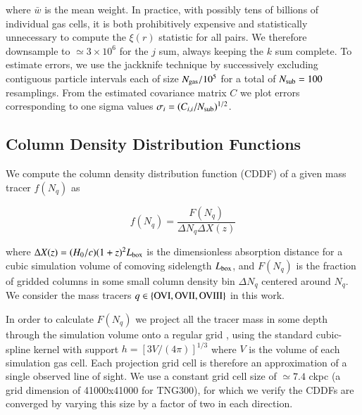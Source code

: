 \documentclass[useAMS,usenatbib]{mnras}
\begin{document}
\noindent where $\bar{w}$ is the mean weight. In practice, with possibly tens of billions of individual gas cells, it is both prohibitively expensive and statistically unnecessary to compute the $\xi(r)$ statistic for all pairs. We therefore downsample to $\simeq 3 \times 10^6$ for the $j$ sum, always keeping the $k$ sum complete. To estimate errors, we use the jackknife technique \citep[see][]{norberg09} by successively excluding contiguous particle intervals each of size $N_{\rm gas}/10^5$ for a total of $N_{\rm sub}=100$ resamplings. From the estimated covariance matrix $C$ we plot errors corresponding to one sigma values $\sigma_i = (C_{i,i} / N_{\rm sub})^{1/2}$. %



\subsection{Column Density Distribution Functions} \label{sec_cddf}

We compute the column density distribution function (CDDF) of a given mass tracer $f(N_q)$ as

\begin{equation}
f(N_q) = \frac{F(N_q)}{\Delta N_q \Delta X(z)}
\end{equation}

\noindent where $\Delta X(z) = (H_0/c)(1+z)^2 L_{\rm box}$ is the dimensionless absorption distance for a cubic simulation volume of comoving sidelength $L_{\rm box}$, and $F(N_q)$ is the fraction of gridded columns in some small column density bin $\Delta N_q$ centered around $N_q$. We consider the mass tracers $q \in \{\rm{OVI, OVII, OVIII}\}$ in this work.

In order to calculate $F(N_q)$ we project all the tracer mass in some depth through the simulation volume onto a regular grid \citep[following][]{bird13}, using the standard cubic-spline kernel with support $h = [3V/(4\pi)]^{1/3}$ where $V$ is the volume of each simulation gas cell. Each projection grid cell is therefore an approximation of a single observed line of sight. We use a constant grid cell size of $\simeq 7.4$ ckpc (a grid dimension of 41000x41000 for TNG300), for which we verify the CDDFs are converged by varying this size by a factor of two in each direction. 
\end{document}
